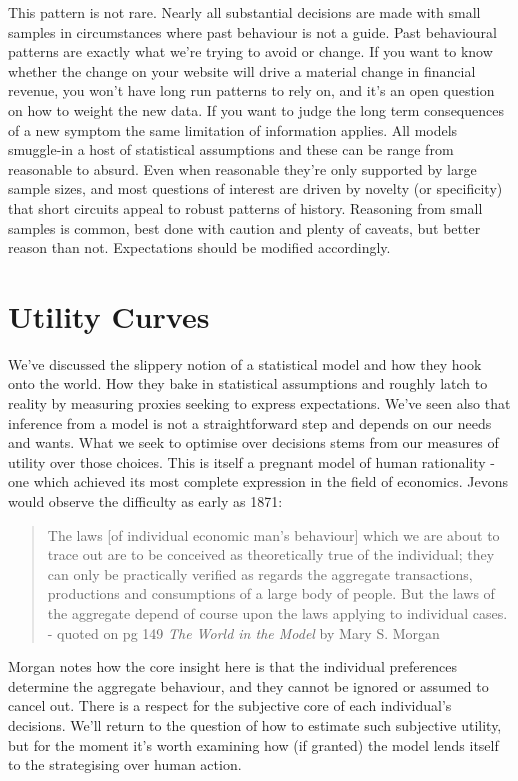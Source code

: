 \documentclass[]{tufte-book}
\theoremstyle{definition}
\theoremstyle{definition}
\theoremstyle{definition}
\theoremstyle{remark}
\begin{document}
This pattern is not rare. Nearly all substantial decisions are made with small samples in circumstances where past behaviour is not a guide. Past behavioural patterns are exactly what we're trying to avoid or change. If you want to know whether the change on your website will drive a material change in financial revenue, you won't have long run patterns to rely on, and it's an open question on how to weight the new data. If you want to judge the long term consequences of a new symptom the same limitation of information applies. All models smuggle-in a host of statistical assumptions and these can be range from reasonable to absurd. Even when reasonable they're only supported by large sample sizes, and most questions of interest are driven by novelty (or specificity) that short circuits appeal to robust patterns of history. Reasoning from small samples is common, best done with caution and plenty of caveats, but better reason than not. Expectations should be modified accordingly.

\hypertarget{utility-curves}{%
\section{Utility Curves}\label{utility-curves}}

We've discussed the slippery notion of a statistical model and how they hook onto the world. How they bake in statistical assumptions and roughly latch to reality by measuring proxies seeking to express expectations. We've seen also that inference from a model is not a straightforward step and depends on our needs and wants. What we seek to optimise over decisions stems from our measures of utility over those choices. This is itself a pregnant model of human rationality - one which achieved its most complete expression in the field of economics. Jevons would observe the difficulty as early as 1871:

\begin{quote}
The laws {[}of individual economic man's behaviour{]} which we are about to trace out are to be conceived as theoretically true of the individual; they can only be practically verified as regards the aggregate transactions, productions and consumptions of a large body of people. But the laws of the aggregate depend of course upon the laws applying to individual cases. - quoted on pg 149 \emph{The World in the Model} by Mary S. Morgan
\end{quote}

Morgan notes how the core insight here is that the individual preferences determine the aggregate behaviour, and they cannot be ignored or assumed to cancel out. There is a respect for the subjective core of each individual's decisions. We'll return to the question of how to estimate such subjective utility, but for the moment it's worth examining how (if granted) the model lends itself to the strategising over human action.
\end{document}
